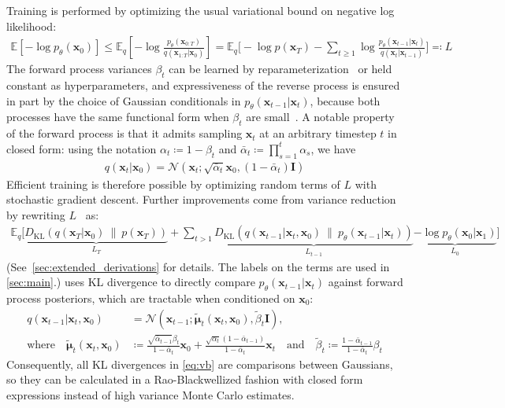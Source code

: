 \documentclass{article}
\newcommand{\defeq}{\coloneqq}
\newcommand{\E}{\mathbb{E}}
\newcommand{\Ea}[1]{\E\left[#1\right]}
\newcommand{\Eb}[2]{\E_{#1}\!\left[#2\right]}
\newcommand{\kl}[2]{D_{\mathrm{KL}}\!\left(#1 ~ \| ~ #2\right)}
\newcommand{\bI}{\mathbf{I}}
\newcommand{\bx}{\mathbf{x}}
\newcommand{\bmu}{{\boldsymbol{\mu}}}
\begin{document}
Training is performed by optimizing the usual variational bound on negative log likelihood:
\begin{align}
\Ea{-\log p_\theta(\bx_0)} \leq \Eb{q}{ - \log \frac{p_\theta(\bx_{0:T})}{q(\bx_{1:T} | \bx_0)}}
  = \mathbb{E}_q\bigg[ -\log p(\bx_T) - \sum_{t \geq 1} \log \frac{p_\theta(\bx_{t-1} | \bx_t)}{q(\bx_t|\bx_{t-1})} \bigg] \eqqcolon L \label{eq:vb_original}
\end{align}
The forward process variances $\beta_t$ can be learned by reparameterization~\citep{kingma2013auto} or held constant as hyperparameters, and
expressiveness of the reverse process is ensured in part by the choice of Gaussian conditionals in $p_\theta(\bx_{t-1}|\bx_t)$, because both processes have the same functional form when $\beta_t$ are small~\citep{sohl2015deep}. 
A notable property of the forward process is that it admits sampling  $\bx_t$ at an arbitrary timestep $t$ in closed form: using the notation $\alpha_t \defeq 1-\beta_t$ and $\bar\alpha_t \defeq \prod_{s=1}^t \alpha_s$, we have
\begin{align}
  q(\bx_t|\bx_0) = \mathcal{N}(\bx_t; \sqrt{\bar\alpha_t}\bx_0, (1-\bar\alpha_t)\bI) \label{eq:q_marginal_arbitrary_t}
\end{align}
Efficient training is therefore possible by optimizing random terms of $L$ with stochastic gradient descent.
Further improvements come from variance reduction by rewriting $L$~ as:
\begin{align}
\mathbb{E}_q \bigg[ \underbrace{\kl{q(\bx_T|\bx_0)}{p(\bx_T)}}_{L_T} + \sum_{t > 1} \underbrace{\kl{q(\bx_{t-1}|\bx_t,\bx_0)}{p_\theta(\bx_{t-1}|\bx_t)}}_{L_{t-1}} \underbrace{-\log p_\theta(\bx_0|\bx_1)}_{L_0} \bigg] \label{eq:vb}
\end{align}
(See~\cref{sec:extended_derivations} for details. The labels on the terms are used in \cref{sec:main}.)  uses KL divergence to directly compare $p_\theta(\bx_{t-1}|\bx_t)$ against forward process posteriors, which are tractable when conditioned on $\bx_0$:
\begin{align}
q(\bx_{t-1}|\bx_t,\bx_0) &=  \mathcal{N}(\bx_{t-1}; \tilde\bmu_t(\bx_t, \bx_0), \tilde\beta_t \bI), \\
\text{where}\quad \tilde\bmu_t(\bx_t, \bx_0) &\defeq \frac{\sqrt{\bar\alpha_{t-1}}\beta_t }{1-\bar\alpha_t}\bx_0 + \frac{\sqrt{\alpha_t}(1- \bar\alpha_{t-1})}{1-\bar\alpha_t} \bx_t \quad \text{and} \quad
\tilde\beta_t \defeq \frac{1-\bar\alpha_{t-1}}{1-\bar\alpha_t}\beta_t  \label{eq:q_posterior_mean_var}
\end{align}
Consequently, all KL divergences in \cref{eq:vb} are comparisons between Gaussians, so they can be calculated in a Rao-Blackwellized fashion with closed form expressions instead of high variance Monte Carlo estimates.
\end{document}
